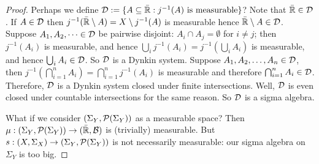 \begin{proof}
Perhaps we define $\mathcal{D} := \{A \subseteq \bar{\mathbb{R}} : j^{-1}(A) \text{ is measurable}\}$?
Note that $\bar{\mathbb{R}} \in \mathcal{D}$.
If $A \in \mathcal{D}$ then $j^{-1}(\bar{\mathbb{R}} \setminus A) = X \setminus j^{-1}(A)$ is measurable hence $\bar{\mathbb{R}} \setminus A \in \mathcal{D}$.
Suppose $A_1,A_2,\dots \in \mathcal{D}$ be pairwise disjoint: $A_i \cap A_j = \emptyset$ for $i\ne j$;
then $j^{-1}(A_i)$ is measurable, and hence $\bigcup_i j^{-1}(A_i) = j^{-1} (\bigcup_i A_i)$ is measurable,
and hence $\bigcup_i A_i \in \mathcal{D}$.
So $\mathcal{D}$ is a Dynkin system.
Suppose $A_1,A_2,\dots,A_n \in \mathcal{D}$, then $j^{-1}(\bigcap_{i=1}^n A_i) = \bigcap_{i=1}^n j^{-1}(A_i)$
is measurable and therefore $\bigcap_{i=1}^n A_i \in \mathcal{D}$.
Therefore, $\mathcal{D}$ is a Dynkin system closed under finite intersections.
Well, $\mathcal{D}$ is even closed under countable intersections for the same reason.
So $\mathcal{D}$ is a sigma algebra.

What if we consider $(\Sigma_Y,\mathcal{P}(\Sigma_Y))$ as a measurable space?
Then $\mu : (\Sigma_Y,\mathcal{P}(\Sigma_Y)) \to (\bar{\mathbb{R}},\mathcal{B})$ is (trivially) measurable.
But $s : (X,\Sigma_X) \to (\Sigma_Y,\mathcal{P}(\Sigma_Y))$ is not necessarily measurable: our sigma algebra on $\Sigma_Y$ is too big.
\end{proof}

